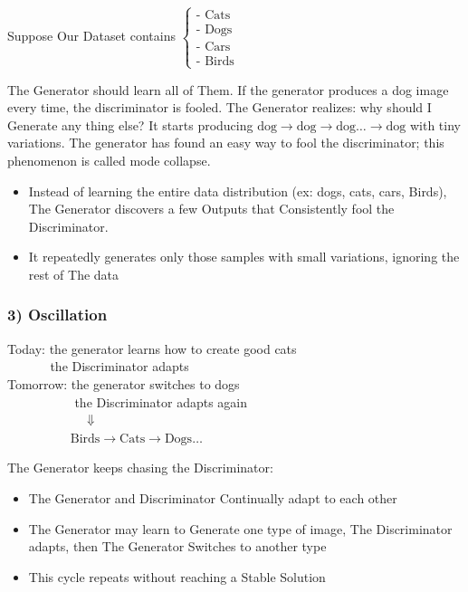 Suppose Our Dataset contains $\begin{cases} \text{- Cats} \\ \text{- Dogs} \\ \text{- Cars} \\ \text{- Birds} \end{cases}$

The Generator should learn all of Them.
If the generator produces a dog image every time, the discriminator is fooled.
The Generator realizes: why should I Generate any thing else?
It starts producing $\text{dog} \rightarrow \text{dog} \rightarrow \text{dog} \dots \rightarrow \text{dog}$ with tiny variations. The generator has found an easy way to fool the discriminator; this phenomenon is called mode collapse.
\begin{itemize}
    \item Instead of learning the entire data distribution (ex: dogs, cats, cars, Birds), The Generator discovers a few Outputs that Consistently fool the Discriminator.
    \item It repeatedly generates only those samples with small variations, ignoring the rest of The data
\end{itemize}

\subsubsection*{3) Oscillation}

Today: the generator learns how to create good cats \\
$\phantom{today:\ }$ the Discriminator adapts \\
Tomorrow: the generator switches to dogs \\
$\phantom{tomorrow:\ }$ the Discriminator adapts again \\
$\phantom{tomorrow:\ } \quad \Downarrow$ \\
$\phantom{tomorrow:\ } \text{Birds} \rightarrow \text{Cats} \rightarrow \text{Dogs} \dots$

The Generator keeps chasing the Discriminator:
\begin{itemize}
    \item The Generator and Discriminator Continually adapt to each other
    \item The Generator may learn to Generate one type of image, The Discriminator adapts, then The Generator Switches to another type
    \item This cycle repeats without reaching a Stable Solution
\end{itemize}

